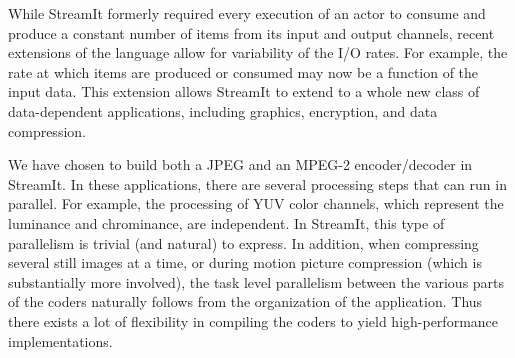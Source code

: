 While StreamIt formerly required every execution of an actor to
consume and produce a constant number of items from its input and
output channels, recent extensions of the language allow for
variability of the I/O rates. For example, the rate at which items are
produced or consumed may now be a function of the input data. This
extension allows StreamIt to extend to a whole new class of
data-dependent applications, including graphics, encryption, and data
compression.

We have chosen to build both a JPEG and an MPEG-2 encoder/decoder in
StreamIt. In these applications, there are several processing steps
that can run in parallel. For example, the processing of YUV color
channels, which represent the luminance and chrominance, are
independent. In StreamIt, this type of parallelism is trivial (and
natural) to express. In addition, when compressing several still
images at a time, or during motion picture compression (which is
substantially more involved), the task level parallelism between the
various parts of the coders naturally follows from the organization of
the application. Thus there exists a lot of flexibility in compiling
the coders to yield high-performance implementations.


